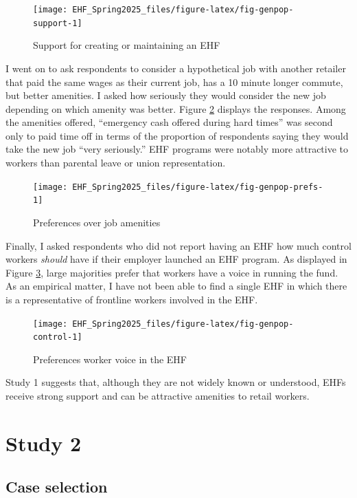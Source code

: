 \documentclass[
  11pt,
  oneside]{article}
\begin{document}
\begin{figure}
\texttt{[image: EHF\_Spring2025\_files/figure-latex/fig-genpop-support-1]} \caption{Support for creating or maintaining  an EHF}\label{fig:fig-genpop-support}
\end{figure}

I went on to ask respondents to consider a hypothetical job with another retailer that paid the same wages as their current job, has a 10 minute longer commute, but better amenities. I asked how seriously they would consider the new job depending on which amenity was better. Figure \ref{fig:fig-genpop-prefs} displays the responses. Among the amenities offered, ``emergency cash offered during hard times'' was second only to paid time off in terms of the proportion of respondents saying they would take the new job ``very seriously.'' EHF programs were notably more attractive to workers than parental leave or union representation.

\begin{figure}
\texttt{[image: EHF\_Spring2025\_files/figure-latex/fig-genpop-prefs-1]} \caption{Preferences over job amenities}\label{fig:fig-genpop-prefs}
\end{figure}

Finally, I asked respondents who did not report having an EHF how much control workers \emph{should} have if their employer launched an EHF program. As displayed in Figure \ref{fig:fig-genpop-control}, large majorities prefer that workers have a voice in running the fund. As an empirical matter, I have not been able to find a single EHF in which there is a representative of frontline workers involved in the EHF.

\begin{figure}
\texttt{[image: EHF\_Spring2025\_files/figure-latex/fig-genpop-control-1]} \caption{Preferences worker voice in the EHF}\label{fig:fig-genpop-control}
\end{figure}

Study 1 suggests that, although they are not widely known or understood, EHFs receive strong support and can be attractive amenities to retail workers.

\section{Study 2}\label{study-2}

\subsection{Case selection}\label{case-selection}
\end{document}
